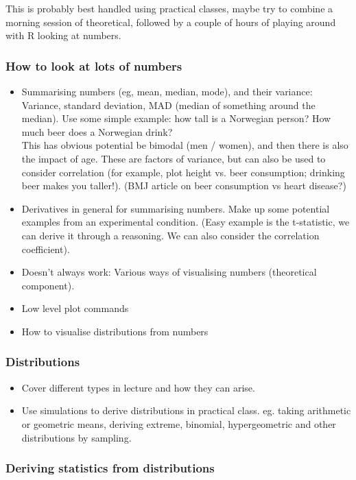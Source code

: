\documentclass{scrartcl}
\begin{document}
This is probably best handled using practical classes, maybe try to
combine a morning session of theoretical, followed by a couple of
hours of playing around with R looking at numbers.
\subsubsection{How to look at lots of numbers}
\label{sec-3-3-1}

\begin{itemize}
\item Summarising numbers (eg, mean, median, mode), and their variance:
  Variance, standard deviation, MAD (median of something around the median).
  Use some simple example: how tall is a Norwegian person? How much beer
  does a Norwegian drink?\\
  This has obvious potential be bimodal (men / women), and then there
  is also the impact of age. These are factors of variance, but can also
  be used to consider correlation (for example, plot height vs. beer
  consumption; drinking beer makes you taller!). (BMJ article on beer
  consumption vs heart disease?)
\item Derivatives in general for summarising numbers. Make up some potential
  examples from an experimental condition. (Easy example is the t-statistic,
  we can derive it through a reasoning. We can also consider the correlation
  coefficient).
\item Doesn't always work: Various ways of visualising numbers (theoretical component).
\item Low level plot commands
\item How to visualise distributions from numbers
\end{itemize}
\subsubsection{Distributions}
\label{sec-3-3-2}

\begin{itemize}
\item Cover different types in lecture and how they can arise.
\item Use simulations to derive distributions in practical class.
  eg. taking arithmetic or geometric means, deriving extreme,
  binomial, hypergeometric and other distributions by sampling.
\end{itemize}
\subsubsection{Deriving statistics from distributions}
\label{sec-3-3-3}
\end{document}
